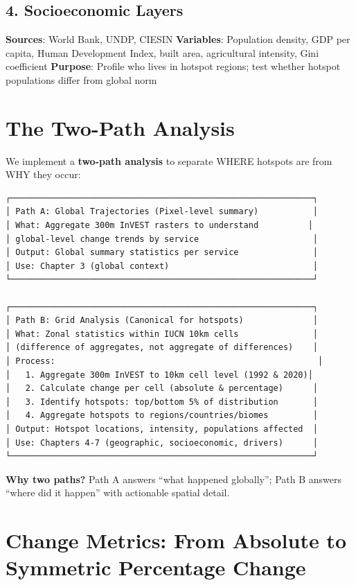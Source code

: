 \documentclass[
  letterpaper,
  DIV=11,
  numbers=noendperiod]{scrreprt}
\begin{document}
\subsection{4. Socioeconomic Layers}\label{socioeconomic-layers}

\textbf{Sources}: World Bank, UNDP, CIESIN \textbf{Variables}:
Population density, GDP per capita, Human Development Index, built area,
agricultural intensity, Gini coefficient \textbf{Purpose}: Profile who
lives in hotspot regions; test whether hotspot populations differ from
global norm

\section{The Two-Path Analysis}\label{the-two-path-analysis}

We implement a \textbf{two-path analysis} to separate WHERE hotspots are
from WHY they occur:

\begin{verbatim}
┌─────────────────────────────────────────────────────────────┐
│ Path A: Global Trajectories (Pixel-level summary)           │
│ What: Aggregate 300m InVEST rasters to understand          │
│ global-level change trends by service                       │
│ Output: Global summary statistics per service               │
│ Use: Chapter 3 (global context)                             │
└─────────────────────────────────────────────────────────────┘

┌─────────────────────────────────────────────────────────────┐
│ Path B: Grid Analysis (Canonical for hotspots)              │
│ What: Zonal statistics within IUCN 10km cells               │
│ (difference of aggregates, not aggregate of differences)    │
│ Process:                                                     │
│   1. Aggregate 300m InVEST to 10km cell level (1992 & 2020)│
│   2. Calculate change per cell (absolute & percentage)      │
│   3. Identify hotspots: top/bottom 5% of distribution       │
│   4. Aggregate hotspots to regions/countries/biomes         │
│ Output: Hotspot locations, intensity, populations affected  │
│ Use: Chapters 4-7 (geographic, socioeconomic, drivers)      │
└─────────────────────────────────────────────────────────────┘
\end{verbatim}

\textbf{Why two paths?} Path A answers ``what happened globally''; Path
B answers ``where did it happen'' with actionable spatial detail.

\section{Change Metrics: From Absolute to Symmetric Percentage
Change}\label{change-metrics-from-absolute-to-symmetric-percentage-change}
\end{document}
